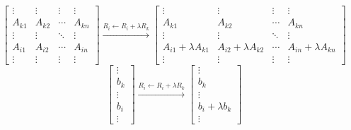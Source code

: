 	\[ \begin{bmatrix} \vdots & \vdots & \vdots & \vdots \\ A_{k1} & A_{k2} & \cdots & A_{kn} \\ \vdots & \vdots & \ddots & \vdots \\ A_{i1} & A_{i2} & \cdots & A_{in} \\ \vdots & \vdots & \vdots & \vdots \end{bmatrix} \xrightarrow{R_i \leftarrow R_i + \lambda{}R_k} \begin{bmatrix} \vdots & \vdots & \vdots & \vdots \\ A_{k1} & A_{k2} & \cdots & A_{kn} \\ \vdots & \vdots & \ddots & \vdots \\ A_{i1}+\lambda{}A_{k1} & A_{i2}+\lambda{}A_{k2} & \cdots & A_{in}+\lambda{}A_{kn} \\ \vdots & \vdots & \vdots & \vdots \end{bmatrix}\]
		\[ \begin{bmatrix} \vdots \\ b_k \\ \vdots \\ b_i \\ \vdots \end{bmatrix} \xrightarrow{R_i \leftarrow R_i + \lambda{}R_k} \begin{bmatrix} \vdots \\ b_k \\ \vdots \\ b_i + \lambda{}b_k \\ \vdots \end{bmatrix} \]
			


